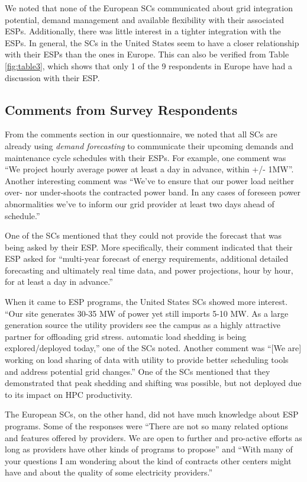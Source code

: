 
We noted that none of the European SCs communicated about grid integration potential, demand management and available flexibility with their associated ESPs. Additionally, there was little interest in a tighter integration with the ESPs. In general, the SCs in the United States seem to have a closer relationship with their ESPs than the ones in Europe. This can also be verified from Table \ref{fig:table3}, which shows that only 1 of the 9 respondents in Europe have had a discussion with their ESP. 

\subsection{Comments from Survey Respondents}
\label{comm}
From the comments section in our questionnaire, we noted that all SCs are already using \emph{demand forecasting} to communicate their upcoming demands and maintenance cycle schedules with their ESPs. For example, one comment was ``We project hourly average power at least a day in advance, within +/- 1MW''. Another interesting comment was ``We've to ensure that our power load neither over- nor under-shoots the contracted power band. In any cases of foreseen power abnormalities we've to inform our grid provider at least two days ahead of schedule.''

One of the SCs mentioned that they could not provide the forecast that was being asked by their ESP. More specifically, their comment indicated that their ESP asked for ``multi-year forecast of energy requirements, additional detailed forecasting and ultimately real time data, and power projections, hour by hour, for at least a day in advance.''

When it came to ESP programs, the United States SCs showed more interest. ``Our site generates 30-35 MW of power yet still imports 5-10 MW. As a large generation source the utility providers see the campus as a highly attractive partner for offloading grid stress. automatic load shedding is being explored/deployed today,'' one of the SCs noted. Another comment was ``[We are] working on load sharing of data with utility to provide better scheduling tools and address potential grid changes.'' One of the SCs mentioned that they demonstrated that peak shedding and shifting was possible, but not deployed due to its impact on HPC productivity. 

The European SCs, on the other hand, did not have much knowledge about ESP programs. Some of the responses were ``There are not so many related options and features offered by providers. We are open to further and pro-active efforts as long as providers have other kinds of programs to propose'' and ``With many of your questions I am wondering about the kind of contracts other centers might have and about the quality of some electricity providers.''

